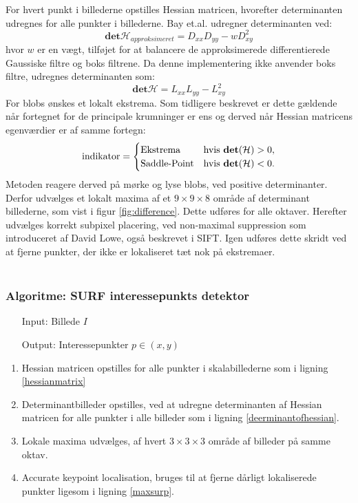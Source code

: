 For hvert punkt i billederne opstilles Hessian matricen, hvorefter determinanten udregnes for alle punkter i billederne. Bay et.al. udregner determinanten ved:
\begin{equation}
\textbf{det}\mathcal{H}_{approksimeret} = D_{xx}D_{yy}-wD_{xy}^2
\label{deerminantofhessian}
\end{equation}
hvor $w$ er en vægt, tilføjet for at balancere de approksimerede differentierede Gaussiske filtre og boks filtrene. Da denne implementering ikke anvender boks filtre, udregnes determinanten som:
\begin{equation}
\textbf{det}\mathcal{H} = L_{xx}L_{yy}-L_{xy}^2
\label{deerminantofhessian}
\end{equation}
For blobs ønskes et lokalt ekstrema. Som tidligere beskrevet er dette gældende når fortegnet for de principale krumninger er ens og derved når Hessian matricens egenværdier er af samme fortegn:
\begin{equation}
\begin{split}
\text{indikator} = 
\begin{cases}
\text{Ekstrema}& \text{hvis } \bold{det}(\mathcal{H}) > 0,  \\
\text{Saddle-Point} & \text{hvis } \bold{det}(\mathcal{H}) < 0.
\end{cases}
\end{split}
\label{detman}
\end{equation}
Metoden reagere derved på mørke og lyse blobs, ved positive determinanter. Derfor udvælges et lokalt maxima af et $9\times9\times8$ område af determinant billederne, som vist i figur \ref{fig:difference}. Dette udføres for alle oktaver. Herefter udvælges korrekt subpixel placering, ved non-maximal suppression som introduceret af David Lowe, også beskrevet i SIFT. Igen udføres dette skridt ved at fjerne punkter, der ikke er lokaliseret tæt nok på ekstremaer.
\\
\\
\subsubsection*{Algoritme: SURF interessepunkts detektor}
\begin{enumerate}
\item[Input:] Billede $I$
\item[Output:] Interessepunkter $p \in (x,y)$
\end{enumerate}
\begin{enumerate}
\item {Hessian matricen opstilles for alle punkter i skalabillederne som i ligning \eqref{hessianmatrix}}
\item Determinantbilleder opstilles, ved at udregne determinanten af Hessian matricen for alle punkter i alle billeder som i ligning \eqref{deerminantofhessian}.
\item Lokale maxima udvælges, af hvert $3\times3\times3$ område af billeder på samme oktav.
\item Accurate keypoint localisation, bruges til at fjerne dårligt lokaliserede punkter ligesom i ligning \eqref{maxsurp}.
\end{enumerate}